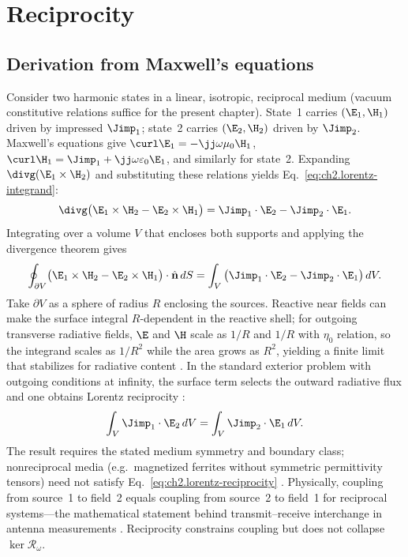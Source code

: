 \section{Reciprocity}
\label{sec:ch02.9}

\subsection{Derivation from Maxwell's equations}
\label{sec:ch02.9.1}

Consider two harmonic states in a linear, isotropic, reciprocal medium (vacuum constitutive relations suffice for the present chapter). State~1 carries $(\E_1,\H_1)$ driven by impressed $\Jimp_1$; state~2 carries $(\E_2,\H_2)$ driven by $\Jimp_2$. Maxwell's equations give $\curl\E_1=-\jj\omega\mu_0\H_1$, $\curl\H_1=\Jimp_1+\jj\omega\varepsilon_0\E_1$, and similarly for state~2. Expanding $\divg(\E_1\times\H_2)$ and substituting these relations yields Eq.~\eqref{eq:ch2.lorentz-integrand}:
\begin{equation}
\label{eq:ch2.lorentz-integrand}
\divg\big(\E_1\times\H_2-\E_2\times\H_1\big)
=\Jimp_1\cdot\E_2-\Jimp_2\cdot\E_1.
\end{equation}
Integrating over a volume $V$ that encloses both supports and applying the divergence theorem gives
\begin{equation}
\label{eq:ch2.lorentz-surface-volume}
\oint_{\partial V}\!\big(\E_1\times\H_2-\E_2\times\H_1\big)\cdot\hat{\mathbf{n}}\,dS
=\int_V \big(\Jimp_1\cdot\E_2-\Jimp_2\cdot\E_1\big)\,dV.
\end{equation}
Take $\partial V$ as a sphere of radius $R$ enclosing the sources. Reactive near fields can make the surface integral $R$-dependent in the reactive shell; for outgoing transverse radiative fields, $\E$ and $\H$ scale as $1/R$ and $1/R$ with $\eta_0$ relation, so the integrand scales as $1/R^2$ while the area grows as $R^2$, yielding a finite limit that stabilizes for radiative content \cite{stratton1941}. In the standard exterior problem with outgoing conditions at infinity, the surface term selects the outward radiative flux and one obtains Lorentz reciprocity \cite{stratton1941,jackson1999}:
\begin{equation}
\label{eq:ch2.lorentz-reciprocity}
\int_V \Jimp_1\cdot\E_2\,dV=\int_V \Jimp_2\cdot\E_1\,dV.
\end{equation}
The result requires the stated medium symmetry and boundary class; nonreciprocal media (e.g.\ magnetized ferrites without symmetric permittivity tensors) need not satisfy Eq.~\eqref{eq:ch2.lorentz-reciprocity} \cite{stratton1941}. Physically, coupling from source~1 to field~2 equals coupling from source~2 to field~1 for reciprocal systems---the mathematical statement behind transmit--receive interchange in antenna measurements \cite{harrington2001}. Reciprocity constrains coupling but does not collapse $\ker\mathcal{R}_\omega$.
